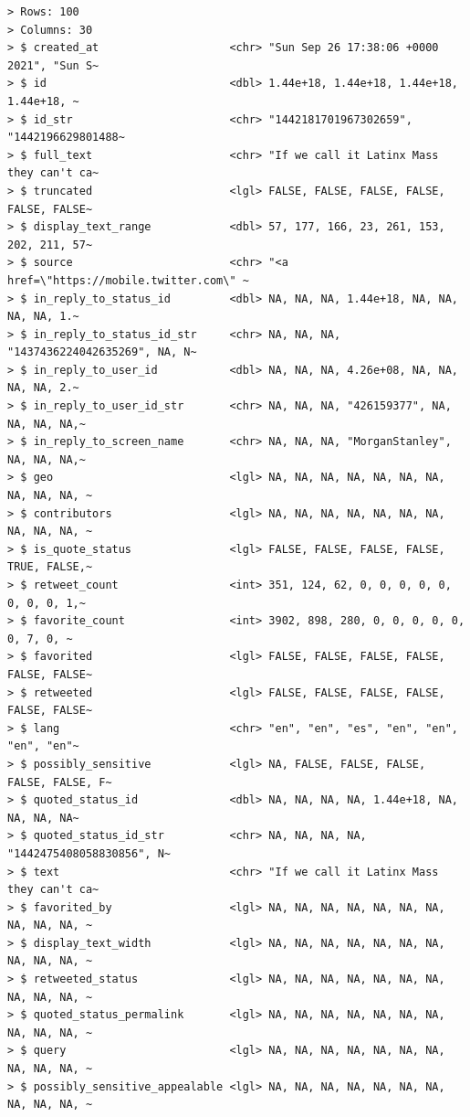 \documentclass[
  letterpaper,
]{latex/krantz}
\begin{document}
\begin{verbatim}
> Rows: 100
> Columns: 30
> $ created_at                    <chr> "Sun Sep 26 17:38:06 +0000 2021", "Sun S~
> $ id                            <dbl> 1.44e+18, 1.44e+18, 1.44e+18, 1.44e+18, ~
> $ id_str                        <chr> "1442181701967302659", "1442196629801488~
> $ full_text                     <chr> "If we call it Latinx Mass they can't ca~
> $ truncated                     <lgl> FALSE, FALSE, FALSE, FALSE, FALSE, FALSE~
> $ display_text_range            <dbl> 57, 177, 166, 23, 261, 153, 202, 211, 57~
> $ source                        <chr> "<a href=\"https://mobile.twitter.com\" ~
> $ in_reply_to_status_id         <dbl> NA, NA, NA, 1.44e+18, NA, NA, NA, NA, 1.~
> $ in_reply_to_status_id_str     <chr> NA, NA, NA, "1437436224042635269", NA, N~
> $ in_reply_to_user_id           <dbl> NA, NA, NA, 4.26e+08, NA, NA, NA, NA, 2.~
> $ in_reply_to_user_id_str       <chr> NA, NA, NA, "426159377", NA, NA, NA, NA,~
> $ in_reply_to_screen_name       <chr> NA, NA, NA, "MorganStanley", NA, NA, NA,~
> $ geo                           <lgl> NA, NA, NA, NA, NA, NA, NA, NA, NA, NA, ~
> $ contributors                  <lgl> NA, NA, NA, NA, NA, NA, NA, NA, NA, NA, ~
> $ is_quote_status               <lgl> FALSE, FALSE, FALSE, FALSE, TRUE, FALSE,~
> $ retweet_count                 <int> 351, 124, 62, 0, 0, 0, 0, 0, 0, 0, 0, 1,~
> $ favorite_count                <int> 3902, 898, 280, 0, 0, 0, 0, 0, 0, 7, 0, ~
> $ favorited                     <lgl> FALSE, FALSE, FALSE, FALSE, FALSE, FALSE~
> $ retweeted                     <lgl> FALSE, FALSE, FALSE, FALSE, FALSE, FALSE~
> $ lang                          <chr> "en", "en", "es", "en", "en", "en", "en"~
> $ possibly_sensitive            <lgl> NA, FALSE, FALSE, FALSE, FALSE, FALSE, F~
> $ quoted_status_id              <dbl> NA, NA, NA, NA, 1.44e+18, NA, NA, NA, NA~
> $ quoted_status_id_str          <chr> NA, NA, NA, NA, "1442475408058830856", N~
> $ text                          <chr> "If we call it Latinx Mass they can't ca~
> $ favorited_by                  <lgl> NA, NA, NA, NA, NA, NA, NA, NA, NA, NA, ~
> $ display_text_width            <lgl> NA, NA, NA, NA, NA, NA, NA, NA, NA, NA, ~
> $ retweeted_status              <lgl> NA, NA, NA, NA, NA, NA, NA, NA, NA, NA, ~
> $ quoted_status_permalink       <lgl> NA, NA, NA, NA, NA, NA, NA, NA, NA, NA, ~
> $ query                         <lgl> NA, NA, NA, NA, NA, NA, NA, NA, NA, NA, ~
> $ possibly_sensitive_appealable <lgl> NA, NA, NA, NA, NA, NA, NA, NA, NA, NA, ~
\end{verbatim}
\end{document}
